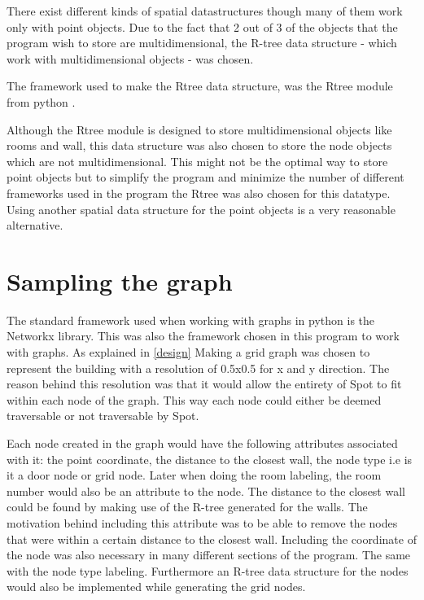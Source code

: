 There exist different kinds of spatial datastructures though many of them work only with point objects. Due to the fact that 2 out of 3 of the objects that the program wish to store are multidimensional, the R-tree data structure - which work with multidimensional objects - was chosen.


The framework used to make the Rtree data structure, was the Rtree module from python \cite{rtree_module}. 

Although the Rtree module is designed to store multidimensional objects like rooms and wall, this data structure was also chosen to store the node objects which are not multidimensional.
This might not be the optimal way to store point objects but to simplify the program and minimize the number of different frameworks used in the program the Rtree was also chosen for this datatype. Using another spatial data structure for the point objects is a very reasonable alternative.


\section{Sampling the graph}
The standard framework used when working with graphs in python is the Networkx library. This was also the framework chosen in this program to work with graphs.
As explained in \ref{design} Making a grid graph was chosen to represent the building with a resolution of 0.5x0.5 for x and y direction. The reason behind this resolution was that it would allow the entirety of Spot to fit within each node of the graph. This way each node could either be deemed traversable or not traversable by Spot.

Each node created in the graph would have the following attributes associated with it: the point coordinate, the distance to the closest wall, the node type i.e is it a door node or grid node. Later when doing the room labeling, the room number would also be an attribute to the node. 
The distance to the closest wall could be found by making use of the R-tree generated for the walls. The motivation behind including this attribute was to be able to remove the nodes that were within a certain distance to the closest wall. Including the coordinate of the node was also necessary in many different sections of the program. The same with the node type labeling. Furthermore an R-tree data structure for the nodes would also be implemented while generating the grid nodes.

